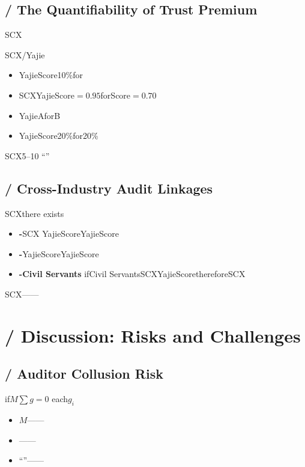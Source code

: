 \documentclass[12pt,a4paper]{article}
\theoremstyle{remark}
\newcommand{\sumgeq}{\sum g = 0}
\begin{document}
\subsection{ / The Quantifiability of Trust Premium}

SCX\textbf{}

SCX/Yajie

\begin{itemize}[leftmargin=*]
    \item YajieScore10\%for
    \item SCXYajieScore$=0.95$forScore$=0.70$
    \item YajieAforB
    \item YajieScore20\%for20\%
\end{itemize}

SCX5--10
``''

\subsection{ / Cross-Industry Audit Linkages}

SCXthere exists

\begin{itemize}[leftmargin=*]
    \item \textbf{-}SCX
    YajieScoreYajieScore

    \item \textbf{-}YajieScoreYajieScore

    \item \textbf{-Civil Servants}
    ifCivil ServantsSCXYajieScorethereforeSCX
\end{itemize}

SCX——


\section{ / Discussion: Risks and Challenges}

\subsection{ / Auditor Collusion Risk}

if$M$$\sumgeq$
each$g_i$


\begin{itemize}[leftmargin=*]
    \item $M$——
    \item ——
    \item ``''——
\end{itemize}
\end{document}

